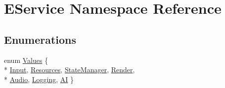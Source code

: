 \hypertarget{namespace_e_service}{\section{E\-Service Namespace Reference}
\label{namespace_e_service}
}
\subsection*{Enumerations}
\begin{DoxyCompactItemize}
\item 
enum \hyperlink{namespace_e_service_a7d0bb3de6ea857dc1253fc5a2cef6884}{Values} \{ \\*
\hyperlink{namespace_e_service_a7d0bb3de6ea857dc1253fc5a2cef6884aaa0c6ca39b12c98963feccbf24d1125e}{Input}, 
\hyperlink{namespace_e_service_a7d0bb3de6ea857dc1253fc5a2cef6884af8fb8c8e8ba7ebade4d641878dd6bd80}{Resources}, 
\hyperlink{namespace_e_service_a7d0bb3de6ea857dc1253fc5a2cef6884a5cafde5fd65dca03221f9b2d151e94ab}{State\-Manager}, 
\hyperlink{namespace_e_service_a7d0bb3de6ea857dc1253fc5a2cef6884a23a6ae22440514fed3b057273d70239c}{Render}, 
\\*
\hyperlink{namespace_e_service_a7d0bb3de6ea857dc1253fc5a2cef6884a99e083bf32988467af021670a7c3ab63}{Audio}, 
\hyperlink{namespace_e_service_a7d0bb3de6ea857dc1253fc5a2cef6884a132e5220105ebc80e23cfcc01f61a68c}{Logging}, 
\hyperlink{namespace_e_service_a7d0bb3de6ea857dc1253fc5a2cef6884a76b185527da9e0f5397b667f3a8539d8}{A\-I}
 \}
\end{DoxyCompactItemize}



